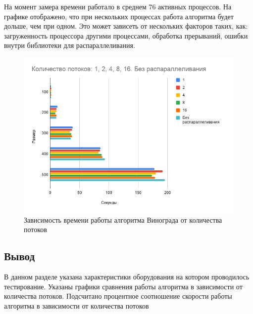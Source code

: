 \documentclass[../main.tex]{subfiles}
\begin{document}
	На момент замера времени работало в среднем 76 активных процессов.
	На графике отображено, что при нескольких процессах работа алгоритма будет дольше, чем при одном. 
	Это может зависеть от нескольких факторов таких, как: загруженность процессора другими процессами, обработка прерываний, ошибки внутри библиотеки для распараллеливания. \\
	
	\begin{figure}[H]
		\centering
		\includegraphics[width=0.7\linewidth]{img/1}
		\caption{Зависимость времени работы алгоритма Винограда от количества потоков}
		\label{fig:diss:1}
	\end{figure}

	\subsection{Вывод}
	
	В данном разделе указана характеристики оборудования на котором проводилось тестирование. 
	Указаны графики сравнения работы алгоритма в зависимости от количества потоков. 
	Подсчитано процентное соотношение скорости работы алгоритма в зависимости от количества потоков
	
\end{document}
